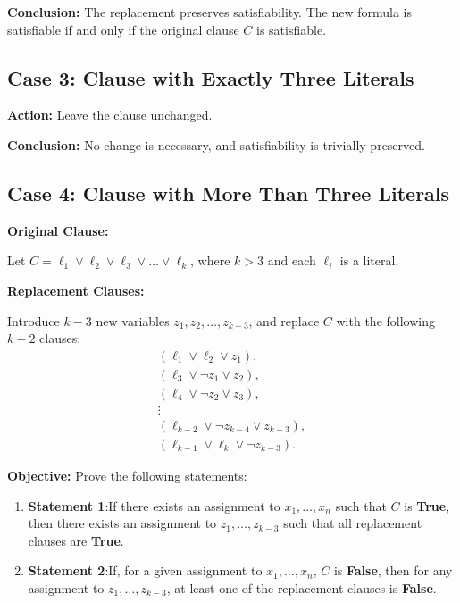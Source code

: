 \documentclass[a4paper]{article}
\begin{document}
\textbf{Conclusion:} The replacement preserves satisfiability. The new formula is satisfiable if and only if the original clause \( C \) is satisfiable.

\subsection*{Case 3: Clause with Exactly Three Literals}

\textbf{Action:} Leave the clause unchanged.

\textbf{Conclusion:} No change is necessary, and satisfiability is trivially preserved.

\subsection*{Case 4: Clause with More Than Three Literals}

\textbf{Original Clause:}

Let \( C = \ell_1 \lor \ell_2 \lor \ell_3 \lor \ldots \lor \ell_k \), where \( k > 3 \) and each \( \ell_i \) is a literal.

\textbf{Replacement Clauses:}

Introduce \( k - 3 \) new variables \( z_1, z_2, \ldots, z_{k-3} \), and replace \( C \) with the following \( k - 2 \) clauses:
\begin{align*}
    (\ell_1 \lor \ell_2 \lor z_1), \\
    (\ell_3 \lor \neg z_1 \lor z_2), \\
    (\ell_4 \lor \neg z_2 \lor z_3), \\
    \vdots \\
    (\ell_{k-2} \lor \neg z_{k-4} \lor z_{k-3}), \\
    (\ell_{k-1} \lor \ell_k \lor \neg z_{k-3}).
\end{align*}

\textbf{Objective:} Prove the following statements:
\begin{enumerate}
    \item \textbf{Statement 1}:If there exists an assignment to \( x_1, \ldots, x_n \) such that \( C \) is \textbf{True}, then there exists an assignment to \( z_1, \ldots, z_{k-3} \) such that all replacement clauses are \textbf{True}.
    \item \textbf{Statement 2}:If, for a given assignment to \( x_1, \ldots, x_n \), \( C \) is \textbf{False}, then for any assignment to \( z_1, \ldots, z_{k-3} \), at least one of the replacement clauses is \textbf{False}.
\end{enumerate}
\end{document}
